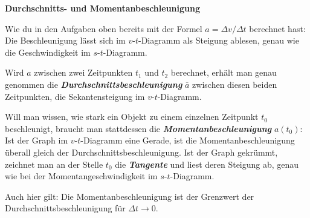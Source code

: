 \documentclass[addpoints,11pt,a4paper]{exam}
\newenvironment{theoriebox}[1][Theorie]{%
  \par\addvspace{10pt}\noindent\textbf{#1}\par\smallskip\noindent
}{%
  \par\addvspace{10pt}
}
\begin{document}
\begin{theoriebox}[Durchschnitts- und Momentanbeschleunigung]
Wie du in den Aufgaben oben bereits mit der Formel $a=\Delta v/\Delta t$
berechnet hast: Die Beschleunigung lässt sich im $v$-$t$-Diagramm als
Steigung ablesen, genau wie die Geschwindigkeit im $s$-$t$-Diagramm.

Wird $a$ zwischen zwei Zeitpunkten $t_1$ und $t_2$ berechnet, erhält man
genau genommen die \textbf{\emph{Durchschnittsbeschleunigung}} $\bar a$
zwischen diesen beiden Zeitpunkten, die Sekantensteigung im
$v$-$t$-Diagramm.

Will man wissen, wie stark ein Objekt zu einem einzelnen Zeitpunkt $t_0$
beschleunigt, braucht man stattdessen die
\textbf{\emph{Momentanbeschleunigung}} $a(t_0)$: Ist der Graph im
$v$-$t$-Diagramm eine Gerade, ist die Momentanbeschleunigung überall
gleich der Durchschnittsbeschleunigung. Ist der Graph gekrümmt, zeichnet
man an der Stelle $t_0$ die \textbf{\emph{Tangente}} und liest deren
Steigung ab, genau wie bei der Momentangeschwindigkeit im
$s$-$t$-Diagramm.

\begin{center}
\end{center}

Auch hier gilt: Die Momentanbeschleunigung ist der Grenzwert der
Durchschnittsbeschleunigung für $\Delta t \to 0$.
\end{theoriebox}
\end{document}

